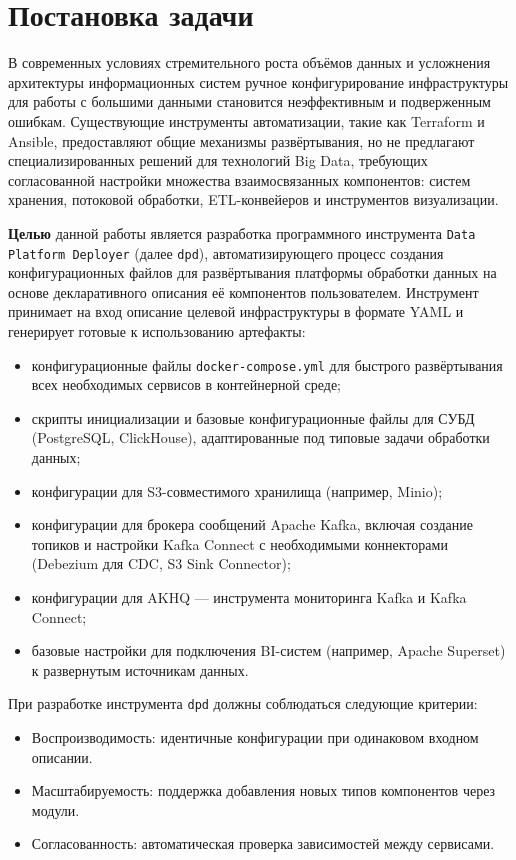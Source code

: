 \chapter*{Постановка задачи} %
В современных условиях стремительного роста объёмов данных и усложнения архитектуры информационных систем ручное конфигурирование инфраструктуры для работы с большими данными становится неэффективным и подверженным ошибкам. Существующие инструменты автоматизации, такие как Terraform и Ansible, предоставляют общие механизмы развёртывания, но не предлагают специализированных решений для технологий Big Data, требующих согласованной настройки множества взаимосвязанных компонентов: систем хранения, потоковой обработки, ETL-конвейеров и инструментов визуализации.

\textbf{Целью} данной работы является разработка программного инструмента \texttt{Data Platform Deployer} (далее \texttt{dpd}), автоматизирующего процесс создания конфигурационных файлов для развёртывания платформы обработки данных на основе декларативного описания её компонентов пользователем. Инструмент принимает на вход описание целевой инфраструктуры в формате YAML и генерирует готовые к использованию артефакты:

\begin{itemize}
    \item конфигурационные файлы \texttt{docker-compose.yml} для быстрого развёртывания всех необходимых сервисов в контейнерной среде;
    \item скрипты инициализации и базовые конфигурационные файлы для СУБД (PostgreSQL, ClickHouse), адаптированные под типовые задачи обработки данных;
    \item конфигурации для S3-совместимого хранилища (например, Minio);
    \item конфигурации для брокера сообщений Apache Kafka, включая создание топиков и настройки Kafka Connect с необходимыми коннекторами (Debezium для CDC, S3 Sink Connector);
    \item конфигурации для AKHQ — инструмента мониторинга Kafka и Kafka Connect;
    \item базовые настройки для подключения BI-систем (например, Apache Superset) к развернутым источникам данных.
\end{itemize}

При разработке инструмента \texttt{dpd} должны соблюдаться следующие критерии:
\begin{itemize}
    \item Воспроизводимость: идентичные конфигурации при одинаковом входном описании.
    \item Масштабируемость: поддержка добавления новых типов компонентов через модули.
    \item Согласованность: автоматическая проверка зависимостей между сервисами.
\end{itemize}

